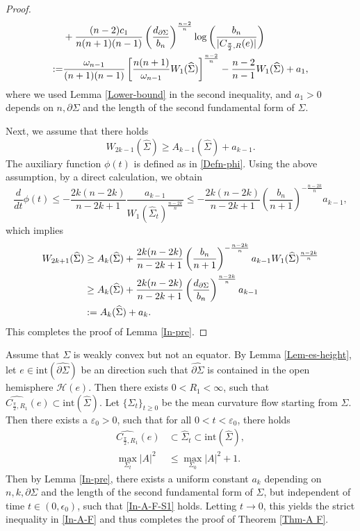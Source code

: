 \documentclass[11pt,reqno]{amsart}
\theoremstyle{definition}
\theoremstyle{remark}
\numberwithin{equation}{section}
\renewcommand{\(}{\left(}
\renewcommand{\)}{\right)}
\renewcommand{\-}{\overline}
\begin{document}
\begin{proof}
\begin{align}
		&+\frac{(n-2)c_1}{n(n+1)(n-1)}\left(\frac{d_{\partial\Sigma}}{b_n}\right)^{\frac{n-2}{n}}\log\left(\frac{b_n}{|C_{\frac{\pi}{2},R}(e)|}\right)\notag\\
		:=&\frac{\omega_{n-1}}{(n+1)(n-1)}\left[\frac{n(n+1)}{\omega_{n-1}}W_1(\widehat{\Sigma})\right]^{\frac{n-2}{n}}-\frac{n-2}{n-1}W_1(\widehat{\Sigma})+a_1,
	\end{align}
	where  we used Lemma \ref{Lower-bound} in the second inequality, and  $a_1>0$ depends on $n,\partial\Sigma$ and the length of the second fundamental form of $\Sigma$. 
	
Next, we assume that there holds
	\begin{equation*}
		W_{2k-1}(\widehat{\Sigma})\geq A_{k-1}(\widehat{\Sigma})+a_{k-1}.
	\end{equation*}
	The auxiliary function $\phi(t)$ is defined as in \eqref{Defn-phi}. Using the above assumption, by a direct calculation, we obtain
	\begin{equation}\label{Mono-phi1}
		\frac{d}{dt}\phi(t)\leq -\frac{2k(n-2k)}{n-2k+1}\frac{a_{k-1}}{W_1(\widehat{\Sigma}_t)^{\frac{n-2k}{n}}}\leq -\frac{2k(n-2k)}{n-2k+1}\left(\frac{b_n}{n+1}\right)^{-\frac{n-2k}{n}}a_{k-1},
	\end{equation}
	which implies
	\begin{align}
		W_{2k+1}(\widehat{\Sigma})&\geq A_k(\widehat{\Sigma})+\frac{2k(n-2k)}{n-2k+1}\left(\frac{b_n}{n+1}\right)^{-\frac{n-2k}{n}}a_{k-1}W_1(\widehat{\Sigma})^{\frac{n-2k}{n}}\notag\\
		&\geq A_k(\widehat{\Sigma})+\frac{2k(n-2k)}{n-2k+1}\left(\frac{d_{\partial\Sigma}}{b_n}\right)^{\frac{n-2k}{n}}a_{k-1}\notag\\
		&:=A_k(\widehat{\Sigma})+a_k.
	\end{align}
	This completes the proof of Lemma \ref{In-pre}.
\end{proof}
Assume that $\Sigma$ is weakly convex but not an equator. By Lemma \ref{Lem-es-height}, let $e\in\mathrm{int}(\widehat{\partial\Sigma})$ be an direction such that $\widehat{\partial\Sigma}$ is contained in the open hemisphere $\mathcal{H}(e)$. Then there exists $0<R_1<\infty$, such that $\widehat{C_{\frac{\pi}{2},R_1}}(e)\subset\mathrm{int}(\widehat{\Sigma})$. Let $\{\Sigma_t\}_{t\geq 0}$ be the mean curvature flow starting from $\Sigma$. Then there exists a $\varepsilon_0>0$, such that for all $0<t<\varepsilon_0$, there holds
\begin{align}
	\widehat{C_{\frac{\pi}{2},R_1}}(e)&\subset\widehat{\Sigma}_t\subset\mathrm{int}(\widehat{\Sigma}),\label{Re-subset}\\
	\max_{\Sigma_t}|A|^2&\leq \max_{\Sigma_0}|A|^2+1.\label{Re-A2}
\end{align}
Then by Lemma \ref{In-pre}, there exists a uniform constant $a_k$ depending on $n,k,\partial\Sigma$ and the length of the second fundamental form of $\Sigma$, but independent of time $t\in(0,\epsilon_0)$, such that \eqref{In-A-F-S1} holds.  Letting $t\to 0$, this yields the strict inequality in \eqref{In-A-F}    and thus completes the proof of Theorem \ref{Thm-A F}.
\end{document}
